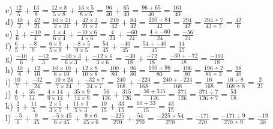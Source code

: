 \documentclass{article}
\begin{document}
c) $\frac{12}{5}+\frac{13}{8}=\frac{12\times8}{5\times8}+\frac{13\times5}{8\times5}=\frac{96}{40}+\frac{65}{40}=\frac{96+65}{40}=\frac{161}{40}$\\ 

d) $\frac{10}{2}+\frac{42}{21}=\frac{10\times21}{2\times21}+\frac{42\times2}{21\times2}=\frac{210}{42}+\frac{84}{42}=\frac{210+84}{42}=\frac{294}{42}=\frac{294\div7}{42\div7}=\frac{42}{6}$\\ 

e) $\frac{1}{6}+\frac{-10}{4}=\frac{1\times4}{6\times4}+\frac{-10\times6}{4\times6}=\frac{4}{24}+\frac{-60}{24}=\frac{4+-60}{24}=\frac{-56}{24}$\\ 

f) $\frac{6}{5}+\frac{-8}{9}=\frac{6\times9}{5\times9}+\frac{-8\times5}{9\times5}=\frac{54}{45}+\frac{-40}{45}=\frac{54+-40}{45}=\frac{14}{45}$\\ 

g) $\frac{-10}{6}+\frac{-12}{3}=\frac{-10\times3}{6\times3}+\frac{-12\times6}{3\times6}=\frac{-30}{18}+\frac{-72}{18}=\frac{-30+-72}{18}=\frac{-102}{18}$\\ 

h) $\frac{10}{8}+\frac{12}{10}=\frac{10\times10}{8\times10}+\frac{12\times8}{10\times8}=\frac{100}{80}+\frac{96}{80}=\frac{100+96}{80}=\frac{196}{80}=\frac{196\div2}{80\div2}=\frac{98}{40}$\\ 

i) $\frac{10}{7}+\frac{-32}{24}=\frac{10\times24}{7\times24}+\frac{-32\times7}{24\times7}=\frac{240}{168}+\frac{-224}{168}=\frac{240+-224}{168}=\frac{16}{168}=\frac{16\div8}{168\div8}=\frac{2}{21}$\\ 

j) $\frac{4}{9}+\frac{35}{14}=\frac{4\times14}{9\times14}+\frac{35\times9}{14\times9}=\frac{56}{126}+\frac{315}{126}=\frac{56+315}{126}=\frac{371}{126}=\frac{371\div7}{126\div7}=\frac{53}{18}$\\ 

k) $\frac{2}{3}+\frac{11}{5}=\frac{2\times5}{3\times5}+\frac{11\times3}{5\times3}=\frac{10}{15}+\frac{33}{15}=\frac{10+33}{15}=\frac{43}{15}$\\ 

l) $\frac{-5}{6}+\frac{9}{45}=\frac{-5\times45}{6\times45}+\frac{9\times6}{45\times6}=\frac{-225}{270}+\frac{54}{270}=\frac{-225+54}{270}=\frac{-171}{270}=\frac{-171\div9}{270\div9}=\frac{-19}{30}$\\ 
\end{document}
